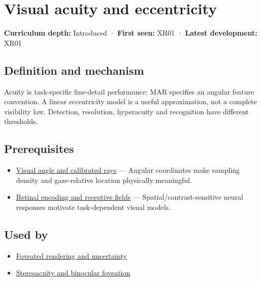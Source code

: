 \hypertarget{appendix-b491fc48c54b}{}\label{referencestart:appendix-b491fc48c54b}
\section{Visual acuity and eccentricity}\label{appendix-b491fc48c54b-visual-acuity-and-eccentricity}

\textbf{Curriculum depth:} Introduced · \textbf{First seen:} XR01 · \textbf{Latest development:} XR01

\begin{allmightroledefinition}

\subsection{Definition and mechanism}\label{appendix-b491fc48c54b-definition-and-mechanism}

Acuity is task-specific fine-detail performance; MAR specifies an angular feature convention. A linear eccentricity model is a useful approximation, not a complete visibility law. Detection, resolution, hyperacuity and recognition have different thresholds.

\end{allmightroledefinition}

\subsection{Prerequisites}\label{appendix-b491fc48c54b-prerequisites}

\begin{itemize}
\tightlist
\item
  \hyperref[appendix-7d356c396d1a]{Visual angle and calibrated rays} --- Angular coordinates make sampling density and gaze-relative location physically meaningful.
\item
  \hyperref[appendix-7281c15ac44a]{Retinal encoding and receptive fields} --- Spatial/contrast-sensitive neural responses motivate task-dependent visual models.
\end{itemize}

\subsection{Used by}\label{appendix-b491fc48c54b-used-by}

\begin{itemize}
\tightlist
\item
  \hyperref[appendix-5878b813b732]{Foveated rendering and uncertainty}
\item
  \hyperref[appendix-8dc848f14052]{Stereoacuity and binocular foveation}
\end{itemize}

